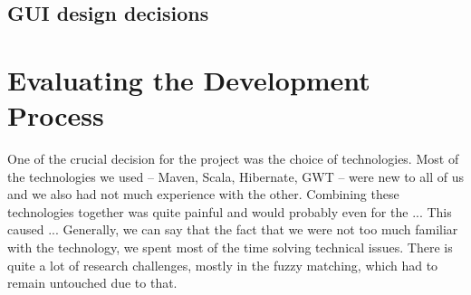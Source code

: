 \subsection{GUI design decisions}

\section{Evaluating the Development Process}

One of the crucial decision for the project was the choice of technologies. Most of the technologies we used -- Maven, Scala, Hibernate, GWT -- were new to all of us and we also had not much experience with the other. Combining these technologies together was quite painful and would probably even for the ... This caused ... Generally, we can say that the fact that we were not too much familiar with the technology, we spent most of the time solving technical issues. There is quite a lot of research challenges, mostly in the fuzzy matching, which had to remain untouched due to that.



